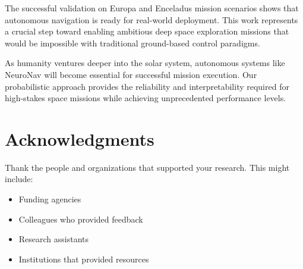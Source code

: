 \documentclass{article}
\begin{document}
The successful validation on Europa and Enceladus mission scenarios shows that autonomous navigation is ready for real-world deployment. This work represents a crucial step toward enabling ambitious deep space exploration missions that would be impossible with traditional ground-based control paradigms.

As humanity ventures deeper into the solar system, autonomous systems like NeuroNav will become essential for successful mission execution. Our probabilistic approach provides the reliability and interpretability required for high-stakes space missions while achieving unprecedented performance levels.

\section*{Acknowledgments}

Thank the people and organizations that supported your research. This might include:
\begin{itemize}
    \item Funding agencies
    \item Colleagues who provided feedback
    \item Research assistants
    \item Institutions that provided resources
\end{itemize}



\end{document}
